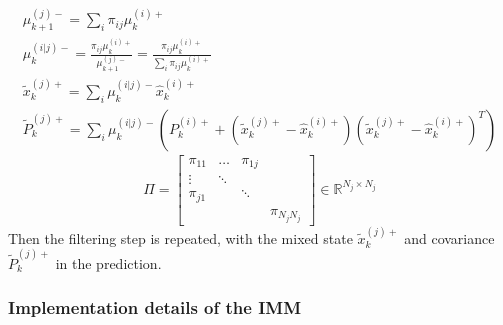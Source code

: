\begin{enumerate}
\begin{gather}
  \mu_{k+1}^{(j)-} = \sum_i \pi_{ij}\mu_k^{(i)+}\\
  \mu_k^{(i|j)-} = \frac{\pi_{ij}\mu_k^{(i)+}}{\mu_{k+1}^{(j)-}} = \frac{\pi_{ij}\mu_k^{(i)+}}{\sum_i \pi_{ij}\mu_k^{(i)+}}\\
  \tilde{x}_k^{(j)+} = \sum_i \mu_k^{(i|j)-} \hat{x}_k^{(i)+}\\
  \tilde{P}_k^{(j)+} = \sum_i \mu_k^{(i|j)-} \left(P_k^{(i)+} + \left(\tilde{x}_k^{(j)+} - \hat{x}_k^{(i)+}\right)\left(\tilde{x}_k^{(j)+} - \hat{x}_k^{(i)+}\right)^T\right)
\end{gather}
\begin{equation}
  \Pi = 
  \begin{bmatrix}
    \pi_{11} & \dots & \pi_{1j} & \\
    \vdots & \ddots & \\
    \pi_{j1} &  & \ddots \\
     & & & \pi_{N_jN_j}
  \end{bmatrix}
  \in \mathbb{R}^{N_j \times N_j}
\end{equation}
Then the filtering step is repeated, with the mixed state $\tilde{x}_k^{(j)+}$ and covariance $\tilde{P}_k^{(j)+}$ in the prediction.
\end{enumerate}

\subsubsection{Implementation details of the IMM}
